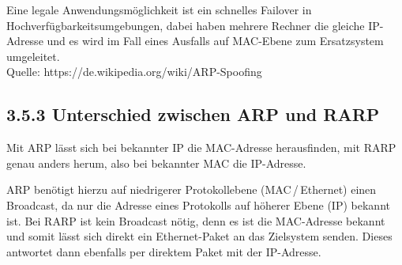 \documentclass[a4paper,
			llpt,
			solution,
			accentcolor=tud2d,
			colorbacktitle
			]
			{tudexercise}
\newcommand{\8}{$\infty$}
\begin{document}
Eine legale Anwendungsmöglichkeit ist ein schnelles Failover in Hochverfügbarkeitsumgebungen, dabei haben mehrere Rechner die gleiche IP-Adresse und es wird im Fall eines Ausfalls auf MAC-Ebene zum Ersatzsystem umgeleitet.
\\
Quelle: https://de.wikipedia.org/wiki/ARP-Spoofing


\subsection{3.5.3 Unterschied zwischen ARP und RARP}

Mit ARP lässt sich bei bekannter IP die MAC-Adresse herausfinden, mit RARP genau anders herum, also bei bekannter MAC die IP-Adresse.

ARP benötigt hierzu auf niedrigerer Protokollebene (MAC\,/\,Ethernet) einen
Broadcast, da nur die Adresse eines Protokolls auf höherer Ebene (IP) bekannt ist. Bei RARP ist kein Broadcast nötig, denn es ist die MAC-Adresse bekannt und somit lässt sich direkt ein Ethernet-Paket an das Zielsystem senden. Dieses antwortet dann ebenfalls per direktem Paket mit der IP-Adresse.
\end{document}
